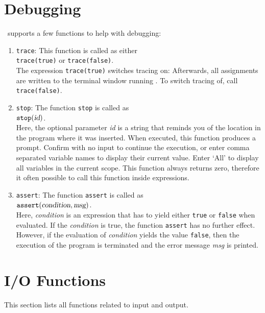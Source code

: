 \section{Debugging}
\setlx\ supports a few functions to help with debugging:
\begin{enumerate}
\item \texttt{trace}:  This function is called as either
      \\[0.2cm]
      \hspace*{1.3cm}
      \texttt{trace(true)} \quad or \quad \texttt{trace(false)}.
      \\[0.2cm]
      The expression \texttt{trace(true)} switches tracing on:  Afterwards, all
      assignments are written to the terminal window running \setlx.  To switch tracing
      of, call \texttt{trace(false)}.
\item \texttt{stop}:  The function \texttt{stop}  is called as
      \\[0.2cm]
      \hspace*{1.3cm}
      $\texttt{stop}(\textsl{id})$.
      \\[0.2cm]
      Here, the optional parameter \textsl{id} is a string that reminds you
      of the location in the program where it was inserted. When executed, this function produces a
      prompt.  Confirm with no input to continue the execution, or enter comma separated variable
      names to display their current value. Enter `All' to display all variables in the current scope.
      This function always returns zero, therefore it often possible to call this function inside expressions.
\item \texttt{assert}: The function \texttt{assert}  is called as
      \\[0.2cm]
      \hspace*{1.3cm}
      $\texttt{assert}(\textsl{condition}, \textsl{msg})$.
      \\[0.2cm]
      Here, \textsl{condition} is an expression that has to  yield either \texttt{true} or \texttt{false}
      when evaluated. If the \textsl{condition} is true, the function \texttt{assert} has no
      further effect.  However, if the evaluation of \textsl{condition} yields the value
      \texttt{false}, then the execution of the program is terminated and the error message
      \textsl{msg} is printed.
\end{enumerate}


\section{I/O Functions}
This  section lists all functions related to input and output.

